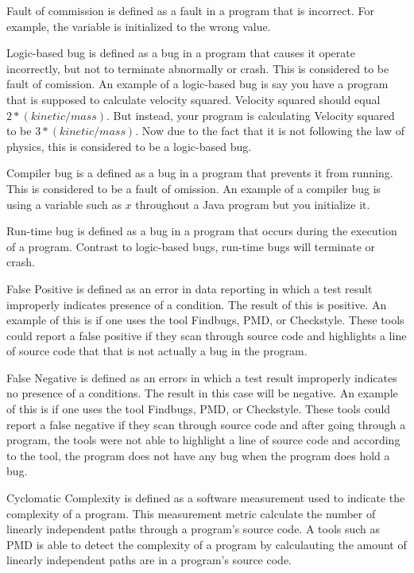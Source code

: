 Fault of commission is defined as a fault in a program that is incorrect. For example, the variable is initialized to the wrong value.


 Logic-based bug is defined as a bug in a program that causes it operate incorrectly, but not to terminate abnormally or crash. This is considered to be fault of comission. An example of a logic-based bug is say you have a program that is supposed to calculate velocity squared. Velocity squared should equal $2 * (kinetic / mass).$ But instead, your program is calculating Velocity squared to be $3 * (kinetic / mass).$ Now due to the fact that it is not following the law of physics, this is considered to be a logic-based bug. 

 Compiler bug is a defined as a bug in a program that prevents it from running. This is considered to be a fault of omission. An example of a compiler bug is using a variable such as $x$ throughout a Java program but you initialize it.

 Run-time bug is defined as a bug in a program that occurs during the execution of a program. Contrast to logic-based bugs, run-time bugs will terminate or crash. 

 False Positive is defined as an error in data reporting in which a test result improperly indicates presence of a condition. The result of this is positive. An example of this is if one uses the tool Findbugs, PMD, or Checkstyle. These tools could report a false positive if they scan through source code and highlights a line of source code that that is not actually a bug in the program. 

 False Negative is defined as an errors in which a test result improperly indicates no presence of a conditions. The result in this case will be negative. An example of this is if one uses the tool Findbugs, PMD, or Checkstyle. These tools could report a false negative if they scan through source code and after going through a program, the tools were not able to highlight a line of source code and according to the tool, the program does not have any bug when the program does hold a bug.


 Cyclomatic Complexity is defined as a software measurement used to indicate the complexity of a program. This measurement metric calculate the number of linearly independent paths through a program's source code. A tools such as PMD is able to detect the complexity of a program by calculauting the amount of linearly independent paths are in a program's source code.

